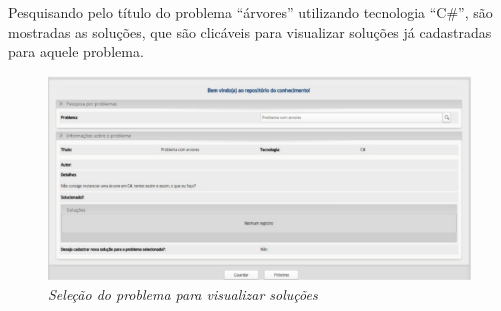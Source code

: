Pesquisando pelo título do problema “árvores” utilizando tecnologia “C\#”, são mostradas as soluções, que são clicáveis para visualizar soluções já cadastradas para aquele problema.

\begin{figure}[H]
\centering\includegraphics[scale=0.5]{figuras/selecaoProblemaSolucoes.png}
\caption{\textit{Seleção do problema para visualizar soluções}}
\end{figure}